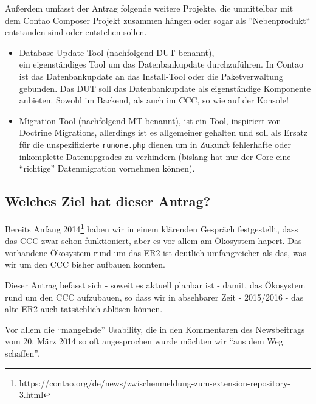 \documentclass[
paper=a4,
draft=false,%
fontsize=10pt%
]{scrartcl}
\begin{document}
Außerdem umfasst der Antrag folgende weitere Projekte, die unmittelbar mit dem Contao Composer Projekt zusammen hängen oder sogar als ''Nebenprodukt`` entstanden sind oder entstehen sollen.

\begin{itemize}
\item Database Update Tool (nachfolgend DUT benannt), \\
ein eigenständiges Tool um das Datenbankupdate durchzuführen. In Contao ist das Datenbankupdate an das Install-Tool oder die Paketverwaltung gebunden. Das DUT soll das Datenbankupdate als eigenständige Komponente anbieten. Sowohl im Backend, als auch im CCC, so wie auf der Konsole!
\item Migration Tool (nachfolgend MT benannt),
ist ein Tool, inspiriert von Doctrine Migrations, allerdings ist es allgemeiner gehalten und soll als Ersatz für die unspezifizierte \texttt{runone.php} dienen um in Zukunft fehlerhafte oder inkomplette Datenupgrades zu verhindern (bislang hat nur der Core eine “richtige” Datenmigration vornehmen können).
\end{itemize}

\subsection{Welches Ziel hat dieser Antrag?}

Bereits Anfang 2014\footnote{https://contao.org/de/news/zwischenmeldung-zum-extension-repository-3.html} haben wir in einem klärenden Gespräch festgestellt, dass das CCC zwar schon funktioniert, aber es vor allem am Ökosystem hapert. Das vorhandene Ökosystem rund um das ER2 ist deutlich umfangreicher als das, was wir um den CCC bisher aufbauen konnten.

Dieser Antrag befasst sich - soweit es aktuell planbar ist - damit, das Ökosystem rund um den CCC aufzubauen, so dass wir in absehbarer Zeit - 2015/2016 - das alte ER2 auch tatsächlich ablösen können.

Vor allem die “mangelnde” Usability, die in den Kommentaren des Newsbeitrags vom 20. März 2014 so oft angesprochen wurde möchten wir “aus dem Weg schaffen”. 

%
%

\newpage
\end{document}
